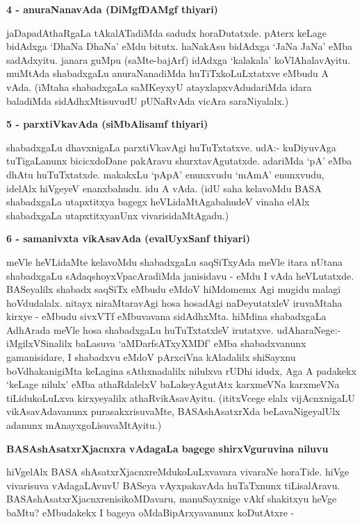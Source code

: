 {\bigskip
\noindent
{\large\bf 4 - anuraNanavAda (DiMgfDAMgf thiyari)}}
\medskip

\noindent
jaDapadAthaRgaLa tAkalATadiMda sadudx horaDutatxde. pAterx keLage bidAdxga `DhaNa DhaNa' eMdu bitutx. haNakAsu bidAdxga `JaNa JaNa' eMba sadAdxyitu. janara guMpu (saMte-bajArf) idAdxga `kalakala' koVlAhalavAyitu. muMtAda shabadxgaLu anuraNanadiMda huTiTxkoLuLxtatxve eMbudu A vAda. (iMtaha\- shabadxgaLa saMKeyxyU atayxlapxvAdudariMda idara baladiMda sidAdhxMtisuvudU pUNaRvAda vicAra saraNi\-yalalx.)

{\bigskip
\noindent
{\large\bf 5 - parxtiVkavAda (siMbAlisamf thiyari)}}
\medskip

\noindent
shabadxgaLu dhavxnigaLa parxtiVkavAgi huTuTxtatxve. udA:- kuDiyuvAga tuTigaLanunx bicicxdoDane pakA\-ravu shurxta\-vAgutatxde. adariMda `pA' eMba dhAtu huTuTxtatxde. makakxLu `pApA' enunxvudu `mAmA' enunxvudu, idelAlx hiVgeyeV enanxbahudu. idu A vAda. (idU saha kelavoMdu BASA shabadxgaLa utapxtitxya bagegx heVLidaMtAgabahudeV vinaha elAlx shabadxgaLa utapxtitxyanUnx vivarisidaMtAgadu.)

{\bigskip
\noindent
{\large\bf 6 - samanivxta vikAsavAda (evalUyxSanf thiyari)}}
\medskip

\noindent
meVle heVLidaMte kelavoMdu shabadxgaLu saqSiTxyAda meVle itara nUtana shabadxgaLu sAdaqshoyxVpa\-cAradiMda janisidavu - eMdu I vAda heVLutatxde. BASeyalilx shabadx saqSiTx eMbudu eMdoV hiMdomemx\- Agi mugidu malagi hoVdudalalx. nitayx niraMtaravAgi hosa hosadAgi naDeyutatxleV iruvaMtaha kirxye - eMbudu sivxVTf eMbuvavana sidAdhxMta. hiMdina shabadxgaLa AdhArada meVle hosa shabadxgaLu huTuTxtatxleV irutatxve. udAharaNege:- iMgilxVSinalilx baLasuva `aMDarfsATxyXMDf' eMba shabadxvanunx gamanisidare, I shabadxvu eMdoV pArxciVna kAladalilx shiSayxnu boVdhakanigiMta keLagina sAthxnadalilx nilulxva rUDhi idudx, Aga A padakekx `keLage nilulx' eMba athaRdalelxV baLakeyAgutAtx karxmeVNa karxmeVNa tiLidukoLuLxva kirxyeyalilx athaRvikAsavAyitu. (ititxVcege elalx vijAcnxnigaLU vikAsavAdavanunx purasakxrisuvaMte, BASAshAsatxrXda beLavaNigeyalUlx adanunx mAnayxgoLisuvaMtAyitu.)

{\bigskip
\noindent
{\large\bf BASAshAsatxrXjacnxra vAdagaLa bagege shirxVguruvina niluvu}}\label{page5}
\medskip

\noindent
hiVgelAlx BASA shAsatxrXjacnxreMdukoLuLxvavara vivaraNe horaTide. hiVge vivarisuva vAdagaLAvuvU BASeya vAyxpakavAda huTaTxnunx tiLisalAravu. BASAshAsatxrXjacnx\-renisikoMDavaru, manuSayxnige vAkf shakitxyu heVge baMtu? eMbudakekx I bageya oMdaBipArxyavanunx koDutAtxre - 

